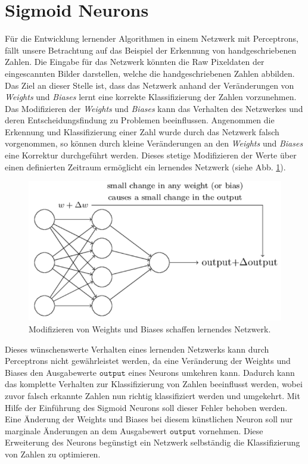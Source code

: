 \section{Sigmoid Neurons}
Für die Entwicklung lernender Algorithmen in einem Netzwerk mit Perceptrons, fällt unsere Betrachtung auf das Beispiel der Erkennung von handgeschriebenen Zahlen. Die Eingabe für das Netzwerk könnten die Raw Pixeldaten der eingescannten Bilder darstellen, welche die handgeschriebenen Zahlen abbilden. Das Ziel an dieser Stelle ist, dass das Netzwerk anhand der Veränderungen von \textit{Weights} und \textit{Biases} lernt eine korrekte Klassifizierung der Zahlen vorzunehmen. \\
Das Modifizieren der \textit{Weights} und \textit{Biases} kann das Verhalten des Netzwerkes und deren Entscheidungsfindung zu Problemen beeinflussen. Angenommen die Erkennung und Klassifizierung einer Zahl wurde durch das Netzwerk falsch vorgenommen, so können durch kleine Veränderungen an den \textit{Weights} und \textit{Biases} eine Korrektur durchgeführt werden. Dieses stetige Modifizieren der Werte über einen definierten Zeitraum ermöglicht ein lernendes Netzwerk (siehe Abb. \ref{fig:sigmoid_learning}). 
\begin{figure}[hbt]
	\centering
	\includegraphics[scale=0.6]{Bilder/sigmoid_learning}
	\caption{Modifizieren von Weights und Biases schaffen lernendes Netzwerk.} 
	\label{fig:sigmoid_learning} 
\end{figure}

\noindent
Dieses wünschenswerte Verhalten eines lernenden Netzwerks kann durch Perceptrons nicht gewährleistet werden, da eine Veränderung der Weights und Biases den Ausgabewerte $\mathtt{output}$ eines Neurons umkehren kann. Dadurch kann das komplette Verhalten zur Klassifizierung von Zahlen beeinflusst werden, wobei zuvor falsch erkannte Zahlen nun richtig klassifiziert werden und umgekehrt. Mit Hilfe der Einführung des Sigmoid Neurons soll dieser Fehler behoben werden. Eine Änderung der Weights und Biases bei diesem künstlichen Neuron soll nur marginale Änderungen an dem Ausgabewert $\mathtt{output}$ vornehmen. Diese Erweiterung des Neurons begünstigt ein Netzwerk selbständig die Klassifizierung von Zahlen zu optimieren. \\

